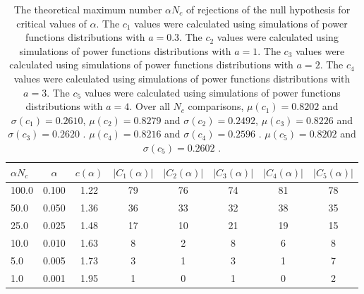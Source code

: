 \begin{table}[h!]
\begin{center}
\begin{tabular}{| l | c | c | c | c | c | c | c |}\hline
$\alpha N_c$ & $\alpha$ & $c(\alpha)$ & $|C_1(\alpha)|$ & $|C_2(\alpha)|$ & $|C_3(\alpha)|$ & $|C_4(\alpha)|$ & $|C_5(\alpha)|$ \\\hline
100.0 & 0.100 & 1.22 & 79 & 76 & 74 & 81 & 78 \\\hline
50.0 & 0.050 & 1.36 & 36 & 33 & 32 & 38 & 35 \\\hline
25.0 & 0.025 & 1.48 & 17 & 10 & 21 & 19 & 15 \\\hline
10.0 & 0.010 & 1.63 & 8 & 2 & 8 & 6 & 8 \\\hline
5.0 & 0.005 & 1.73 & 3 & 1 & 3 & 1 & 7 \\\hline
1.0 & 0.001 & 1.95 & 1 & 0 & 1 & 0 & 2 \\\hline
\end{tabular}
\caption{The theoretical maximum number $\alpha N_c$ of rejections
of the null hypothesis for critical values of $\alpha$.
The $c_1$ values were calculated using simulations of power functions distributions with $a=0.3$.
The $c_2$ values were calculated using simulations of power functions distributions with $a=1$.
The $c_3$ values were calculated using simulations of power functions distributions with $a=2$.
The $c_4$ values were calculated using simulations of power functions distributions with $a=3$.
The $c_5$ values were calculated using simulations of power functions distributions with $a=4$.
Over all $N_c$ comparisons,
 $\mu(c_1)=0.8202$ and $\sigma(c_1)=0.2610$,
 $\mu(c_2)=0.8279$ and $\sigma(c_2)=0.2492$,
 $\mu(c_3)=0.8226$ and $\sigma(c_3)=0.2620$ .
 $\mu(c_4)=0.8216$ and $\sigma(c_4)=0.2596$ .
 $\mu(c_5)=0.8202$ and $\sigma(c_5)=0.2602$ .
}
\end{center}
\end{table}